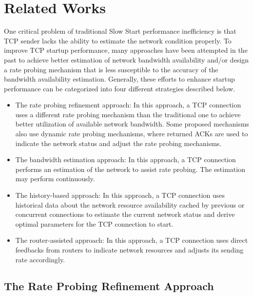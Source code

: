 \documentclass[12pt,onecolumn]{IEEEtran}
\begin{document}
\section{Related Works}\label{sec:literature}

One critical problem of traditional Slow Start performance inefficiency is that
TCP sender lacks the ability to estimate the network condition properly. To
improve TCP startup performance, many approaches have been attempted in the
past to achieve better estimation of network bandwidth availability and/or
design a rate probing mechanism that is less susceptible to the accuracy of the
bandwidth availability estimation. Generally, these efforts to enhance startup
performance can be categorized into four different strategies described below.
\begin{itemize}
    \item The rate probing refinement approach: In this approach, a TCP connection uses
          a different rate probing mechanism than the traditional one to achieve
          better utilization of available network bandwidth. Some proposed
          mechanisms also use dynamic rate probing mechanisms, where returned
          ACKs are used to indicate the network status and adjust the rate probing
          mechanisms.
    \item The bandwidth estimation approach: In this approach, a TCP connection
          performs an estimation of the network to assist rate probing. The estimation may
          perform continuously.
    \item The history-based approach: In this approach, a TCP connection uses
          historical data about the network resource availability cached by
          previous or concurrent connections to estimate the current network status
          and derive optimal parameters for the TCP connection to start.
    \item The router-assisted approach: In this approach, a TCP connection uses
          direct feedbacks from routers to indicate network resources and adjusts
          its sending rate accordingly.
\end{itemize}

\subsection{The Rate Probing Refinement Approach}
\end{document}
